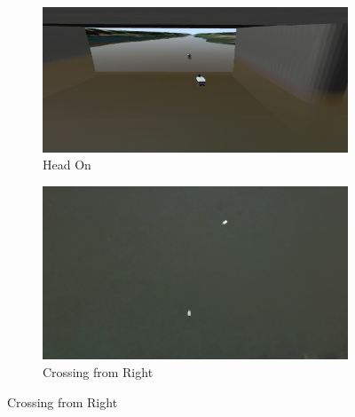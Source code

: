     \begin{figure}[H]
    \centering
    
        \begin{subfigure}[b]{0.5\textwidth}
            \centering
            \includegraphics[width=\textwidth]{figs/Chap5/simulation_uwsim_headon_starting_pos.png}
            \caption{Head On}
            \label{fig:simulation_uwsim_headon_starting_pos}
        \end{subfigure}
        \begin{subfigure}[b]{0.45\textwidth}
            \centering
            \includegraphics[width=\textwidth]{figs/Chap5/simulation_uwsim_crossingright_starting_pos.png}
            \caption{Crossing from Right}
            \label{fig:simulation_uwsim_crossingright_starting_pos}
        \end{subfigure}
        

\end{figure}
